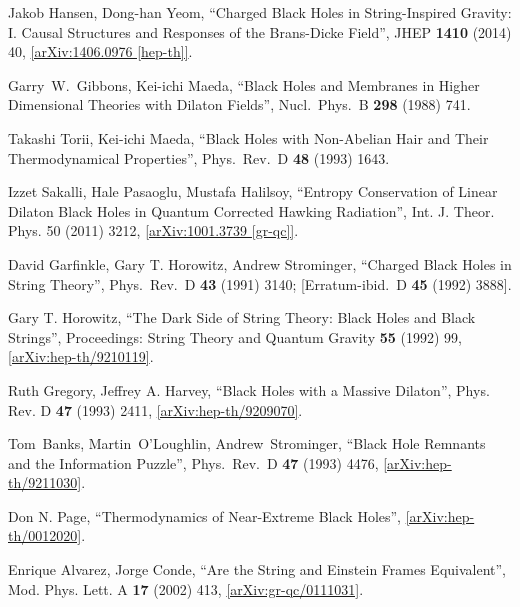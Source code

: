 \documentclass[12pt]{article}
\newcommand{\2}{$^2$}
\newcommand{\3}{$^3$}
\newcommand{\4}{$_4$}
\newcommand{\5}{$_5$}
\begin{document}
\begin{thebibliography}{400}
 Jakob Hansen, Dong-han Yeom,
  ``Charged Black Holes in String-Inspired Gravity: I. Causal Structures and Responses of the Brans-Dicke Field'',
  JHEP {\bf 1410} (2014) 40, \href{http://arxiv.org/abs/1406.0976}{
  [arXiv:1406.0976 [hep-th]]}.

  Garry~W.~Gibbons, Kei-ichi Maeda,
  ``Black Holes and Membranes in Higher Dimensional Theories with Dilaton Fields'',
  Nucl.\ Phys.\ B {\bf 298} (1988) 741.

  Takashi Torii, Kei-ichi Maeda,
  ``Black Holes with Non-Abelian Hair and Their Thermodynamical Properties'', 
  Phys.\ Rev.\ D {\bf 48} (1993) 1643.
	
Izzet Sakalli, Hale Pasaoglu, Mustafa Halilsoy,
``Entropy Conservation of Linear Dilaton Black Holes in Quantum Corrected Hawking Radiation'', Int. J. Theor. Phys. 50 (2011) 3212, \href{http://arxiv.org/abs/1001.3739}{[arXiv:1001.3739 [gr-qc]]}.

  David Garfinkle, Gary T. Horowitz, Andrew Strominger,
  ``Charged Black Holes in String Theory'',
  Phys.\ Rev.\ D {\bf 43} (1991) 3140; 
  [Erratum-ibid.\ D {\bf 45} (1992) 3888].
	
Gary T. Horowitz, ``The Dark Side of String Theory: Black Holes and Black Strings'',  Proceedings: String Theory and Quantum Gravity \textbf{55} (1992) 99, \href{http://arxiv.org/abs/hep-th/9210119}{[arXiv:hep-th/9210119]}.

Ruth Gregory, Jeffrey A. Harvey, ``Black Holes with a Massive Dilaton'', Phys. Rev. D \textbf{47} (1993) 2411, \href{http://arxiv.org/abs/hep-th/9209070}{[arXiv:hep-th/9209070]}.

  Tom~Banks, Martin~O'Loughlin, Andrew~Strominger,
  ``Black Hole Remnants and the Information Puzzle'', 
  Phys.\ Rev.\ D {\bf 47} (1993) 4476, \href{http://arxiv.org/abs/hep-th/9211030}{
  [arXiv:hep-th/9211030]}.

Don N. Page, ``Thermodynamics of Near-Extreme Black Holes'', \href{http://arxiv.org/abs/hep-th/0012020}{[arXiv:hep-th/0012020]}.
	
Enrique Alvarez, Jorge Conde, ``Are the String and Einstein Frames Equivalent'', Mod. Phys. Lett. A \textbf{17} (2002) 413, \href{http://arxiv.org/abs/gr-qc/0111031v1}{[arXiv:gr-qc/0111031]}.


\end{thebibliography}
\end{document}
